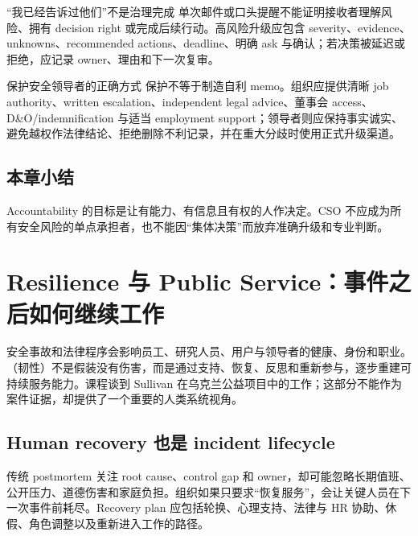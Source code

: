 \documentclass[a4paper]{article}
\begin{document}

\begin{warningbox}{“我已经告诉过他们”不是治理完成}
单次邮件或口头提醒不能证明接收者理解风险、拥有 decision right 或完成后续行动。高风险升级应包含 severity、evidence、unknowns、recommended actions、deadline、明确 ask 与确认；若决策被延迟或拒绝，应记录 owner、理由和下一次复审。
\end{warningbox}

\begin{importantbox}{保护安全领导者的正确方式}
保护不等于制造自利 memo。组织应提供清晰 job authority、written escalation、independent legal advice、董事会 access、D\&O/indemnification 与适当 employment support；领导者则应保持事实诚实、避免越权作法律结论、拒绝删除不利记录，并在重大分歧时使用正式升级渠道。
\end{importantbox}

\subsection{本章小结}

Accountability 的目标是让有能力、有信息且有权的人作决定。CSO 不应成为所有安全风险的单点承担者，也不能因“集体决策”而放弃准确升级和专业判断。

\section{Resilience 与 Public Service：事件之后如何继续工作}

安全事故和法律程序会影响员工、研究人员、用户与领导者的健康、身份和职业。（韧性）不是假装没有伤害，而是通过支持、恢复、反思和重新参与，逐步重建可持续服务能力。课程谈到 Sullivan 在乌克兰公益项目中的工作；这部分不能作为案件证据，却提供了一个重要的人类系统视角。

\subsection{Human recovery 也是 incident lifecycle}

传统 postmortem 关注 root cause、control gap 和 owner，却可能忽略长期值班、公开压力、道德伤害和家庭负担。组织如果只要求“恢复服务”，会让关键人员在下一次事件前耗尽。Recovery plan 应包括轮换、心理支持、法律与 HR 协助、休假、角色调整以及重新进入工作的路径。
\end{document}
